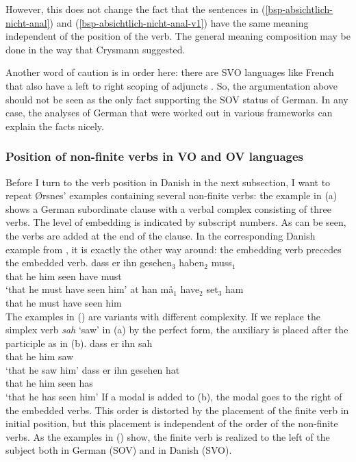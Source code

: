 However, this does not change the fact that the sentences in (\ref{bsp-absichtlich-nicht-anal}) and
(\ref{bsp-absichtlich-nicht-anal-v1}) have the same meaning independent of the position of the
verb. The general meaning composition may be done in the way that Crysmann suggested.%
%

Another word of caution is in order here: there are SVO languages like French that also have a left
to right scoping of adjuncts \citep[--161]{BGK2004a-u}. So, the argumentation above should not be seen as the only
fact supporting the SOV status of German. In any case, the analyses of German that were
worked out in various frameworks can explain the facts nicely.



\subsubsection{Position of non-finite verbs in VO and OV languages}

Before I turn to the verb position in Danish in the next subsection, I want to repeat Ørsnes'
examples containing several non-finite verbs: the example in (a) shows a German subordinate clause with a verbal complex consisting of
three verbs. The level of embedding is indicated by subscript numbers. As can be seen, the verbs are
added at the end of the clause. In the corresponding Danish example from \citet[]{Oersnes2009b}, it is exactly the other way
around: the embedding verb precedes the embedded verb.
\eal
\ex
\gll dass er ihn gesehen$_3$ haben$_2$ muss$_1$\\
     that he him seen        have      must\\
\glt `that he must have seen him'
\ex
\gll at han må$_1$ have$_2$ set$_3$ ham\\
     that he must have seen him\\
\zl
%
The examples in () are variants with different complexity. If we replace the simplex verb
\emph{sah} `saw' in (a) by the perfect form, the auxiliary is placed after the participle as
in (b).
\eal
\ex
\gll dass er ihn sah\\
     that he him saw\\
\glt `that he saw him'
\ex
\gll dass er ihn gesehen hat\\
     that he him seen    has\\
\glt `that he has seen him'
\zl 
If a modal is added to (b), the modal goes to the right of the embedded verbs. This order is
distorted by the placement of the finite verb in initial position, but this placement is independent
of the order of the non-finite verbs. As the examples in () show, the finite verb is realized
to the left of the subject both in German (SOV) and in Danish (SVO).

